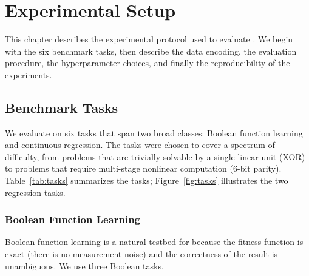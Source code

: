 
\chapter{Experimental Setup}
\label{ch:experiments}

This chapter describes the experimental protocol used to evaluate
\modnet{}. We begin with the six benchmark tasks, then describe the
data encoding, the evaluation procedure, the hyperparameter choices,
and finally the reproducibility of the experiments.

\section{Benchmark Tasks}
\label{sec:tasks}

We evaluate \modnet{} on six tasks that span two broad classes:
Boolean function learning and continuous regression. The tasks were
chosen to cover a spectrum of difficulty, from problems that are
trivially solvable by a single linear unit (XOR) to problems that
require multi-stage nonlinear computation (6-bit parity). Table~\ref{tab:tasks}
summarizes the tasks; Figure~\ref{fig:tasks} illustrates the two
regression tasks.

\subsection{Boolean Function Learning}

Boolean function learning is a natural testbed for \modnet{} because
the fitness function is exact (there is no measurement noise) and the
correctness of the result is unambiguous. We use three Boolean tasks.

